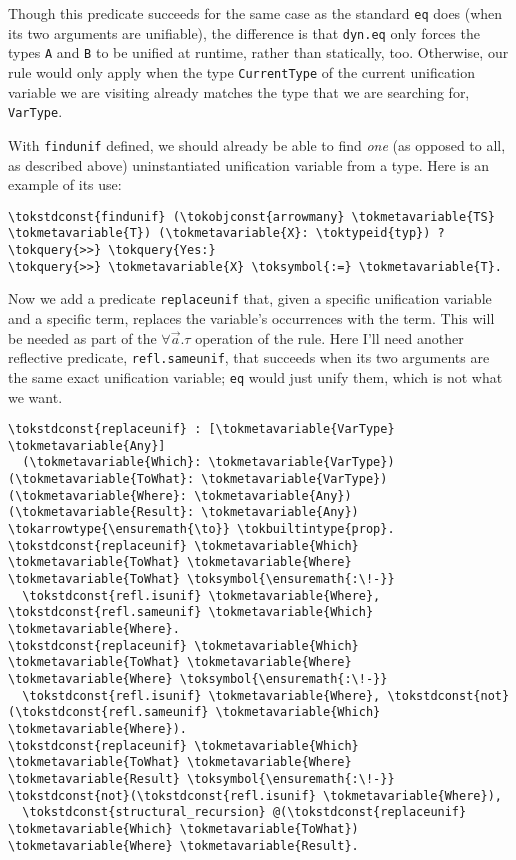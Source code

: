 Though this predicate succeeds for the same case as the standard
\texttt{eq} does (when its two arguments are unifiable), the difference
is that \texttt{dyn.eq} only forces the types \texttt{A} and \texttt{B}
to be unified at runtime, rather than statically, too. Otherwise, our
rule would only apply when the type \texttt{CurrentType} of the current
unification variable we are visiting already matches the type that we
are searching for, \texttt{VarType}.

With \texttt{findunif} defined, we should already be able to find
\emph{one} (as opposed to all, as described above) uninstantiated
unification variable from a type. Here is an example of its use:

\begin{verbatim}
\tokstdconst{findunif} (\tokobjconst{arrowmany} \tokmetavariable{TS} \tokmetavariable{T}) (\tokmetavariable{X}: \toktypeid{typ}) ?
\tokquery{>>} \tokquery{Yes:}
\tokquery{>>} \tokmetavariable{X} \toksymbol{:=} \tokmetavariable{T}.
\end{verbatim}

Now we add a predicate \texttt{replaceunif} that, given a specific
unification variable and a specific term, replaces the variable's
occurrences with the term. This will be needed as part of the
\(\forall \vec{a}.\tau\) operation of the rule. Here I'll need another
reflective predicate, \texttt{refl.sameunif}, that succeeds when its two
arguments are the same exact unification variable; \texttt{eq} would
just unify them, which is not what we want.

\begin{verbatim}
\tokstdconst{replaceunif} : [\tokmetavariable{VarType} \tokmetavariable{Any}]
  (\tokmetavariable{Which}: \tokmetavariable{VarType}) (\tokmetavariable{ToWhat}: \tokmetavariable{VarType}) (\tokmetavariable{Where}: \tokmetavariable{Any}) (\tokmetavariable{Result}: \tokmetavariable{Any}) \tokarrowtype{\ensuremath{\to}} \tokbuiltintype{prop}.
\tokstdconst{replaceunif} \tokmetavariable{Which} \tokmetavariable{ToWhat} \tokmetavariable{Where} \tokmetavariable{ToWhat} \toksymbol{\ensuremath{:\!-}}
  \tokstdconst{refl.isunif} \tokmetavariable{Where}, \tokstdconst{refl.sameunif} \tokmetavariable{Which} \tokmetavariable{Where}.
\tokstdconst{replaceunif} \tokmetavariable{Which} \tokmetavariable{ToWhat} \tokmetavariable{Where} \tokmetavariable{Where} \toksymbol{\ensuremath{:\!-}}
  \tokstdconst{refl.isunif} \tokmetavariable{Where}, \tokstdconst{not}(\tokstdconst{refl.sameunif} \tokmetavariable{Which} \tokmetavariable{Where}).
\tokstdconst{replaceunif} \tokmetavariable{Which} \tokmetavariable{ToWhat} \tokmetavariable{Where} \tokmetavariable{Result} \toksymbol{\ensuremath{:\!-}} \tokstdconst{not}(\tokstdconst{refl.isunif} \tokmetavariable{Where}),
  \tokstdconst{structural_recursion} @(\tokstdconst{replaceunif} \tokmetavariable{Which} \tokmetavariable{ToWhat}) \tokmetavariable{Where} \tokmetavariable{Result}.
\end{verbatim}

